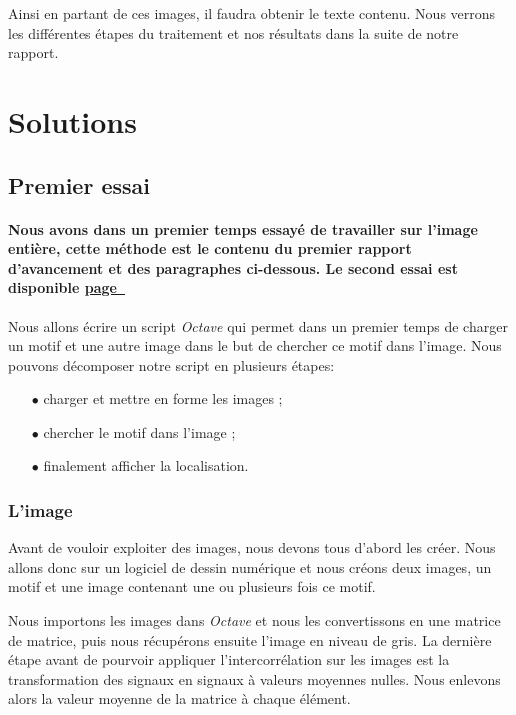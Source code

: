 \documentclass[a4paper,12pt,titlepage]{report}
\newcommand{\octave}{\textit{Octave }}
\begin{document}
Ainsi en partant de ces images, il faudra obtenir le texte contenu. Nous verrons les différentes étapes du traitement et nos résultats dans la suite de notre rapport.

		\vspace{-1.5em}
		\section{Solutions}
		\vspace{-1em}
		\subsection{Premier essai}
		\paragraph*{Nous avons dans un premier temps essayé de travailler sur l'image entière, cette méthode est le contenu du premier rapport d'avancement et des paragraphes ci-dessous. Le second essai est disponible \hyperref[essai2]{page~\pageref*{essai2}}}
				
		Nous allons écrire un script \octave qui permet dans un premier temps de charger un motif et une autre image dans le but de chercher ce motif dans l'image. Nous pouvons décomposer notre script en plusieurs étapes:
		\begin{itemize}
			\item[$\bullet$] charger et mettre en forme les images ;
			\item[$\bullet$] chercher le motif dans l'image ;
			\item[$\bullet$] finalement afficher la localisation.
		\end{itemize}	   
		\subsubsection{L'image}
		\label{image}
		Avant de vouloir exploiter des images, nous devons tous d'abord les créer. Nous allons donc sur un logiciel de dessin numérique et nous créons deux images, un motif et une image contenant une ou plusieurs fois ce motif.
			
		Nous importons les images dans \octave et nous les convertissons en une matrice de matrice, puis nous récupérons ensuite l'image en niveau de gris. La dernière étape avant de pourvoir appliquer l'intercorrélation sur les images est la transformation des signaux en signaux à valeurs moyennes nulles. Nous enlevons alors la valeur moyenne de la matrice à chaque élément.
		
\end{document}

